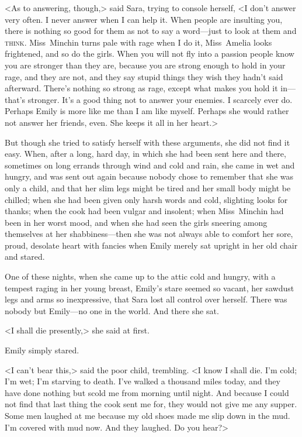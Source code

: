 <As to answering, though,> said Sara, trying to console herself, <I don't answer very often. I never answer when I can help it. When people are insulting you, there is nothing so good for them as not to say a word—just to look at them and \textsc{think}. Miss~Minchin turns pale with rage when I do it, Miss~Amelia looks frightened, and so do the girls. When you will not fly into a passion people know you are stronger than they are, because you are strong enough to hold in your rage, and they are not, and they say stupid things they wish they hadn't said afterward. There's nothing so strong as rage, except what makes you hold it in—that's stronger. It's a good thing not to answer your enemies. I scarcely ever do. Perhaps Emily is more like me than I am like myself. Perhaps she would rather not answer her friends, even. She keeps it all in her heart.>

But though she tried to satisfy herself with these arguments, she did not find it easy. When, after a long, hard day, in which she had been sent here and there, sometimes on long errands through wind and cold and rain, she came in wet and hungry, and was sent out again because nobody chose to remember that she was only a child, and that her slim legs might be tired and her small body might be chilled; when she had been given only harsh words and cold, slighting looks for thanks; when the cook had been vulgar and insolent; when Miss~Minchin had been in her worst mood, and when she had seen the girls sneering among themselves at her shabbiness—then she was not always able to comfort her sore, proud, desolate heart with fancies when Emily merely sat upright in her old chair and stared.

One of these nights, when she came up to the attic cold and hungry, with a tempest raging in her young breast, Emily's stare seemed so vacant, her sawdust legs and arms so inexpressive, that Sara lost all control over herself. There was nobody but Emily—no one in the world. And there she sat.

<I shall die presently,> she said at first.

Emily simply stared.

<I can't bear this,> said the poor child, trembling. <I know I shall die. I'm cold; I'm wet; I'm starving to death. I've walked a thousand miles today, and they have done nothing but scold me from morning until night. And because I could not find that last thing the cook sent me for, they would not give me any supper. Some men laughed at me because my old shoes made me slip down in the mud. I'm covered with mud now. And they laughed. Do you hear?>

